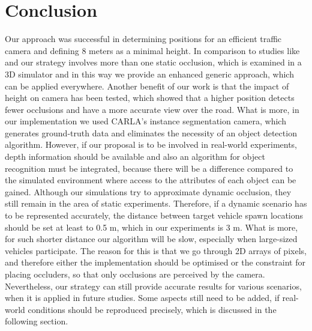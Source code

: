 \section{Conclusion}
Our approach was successful in determining positions for an efficient traffic camera and defining 8 meters as a minimal height. In comparison to studies like \cite{total_coverage_optimum} and \cite{max_camera_coverage} our strategy involves more than one static occlusion, which is examined in a 3D simulator and in this way we provide an enhanced generic approach, which can be applied everywhere. Another benefit of our work is that the impact of height on camera has been tested, which showed that a higher position detects fewer occlusions and have a more accurate view over the road. What is more, in our implementation we used CARLA's instance segmentation camera, which generates ground-truth data and eliminates the necessity of an object detection algorithm. However, if our proposal is to be involved in real-world experiments, depth information should be available and also an algorithm for object recognition must be integrated, because there will be a difference compared to the simulated environment where access to the attributes of each object can be gained. Although our simulations try to approximate dynamic occlusion, they still remain in the area of static experiments. Therefore, if a dynamic scenario has to be represented accurately, the distance between target vehicle spawn locations should be set at least to 0.5 m, which in our experiments is 3 m. What is more, for such shorter distance our algorithm will be slow, especially when large-sized vehicles participate. The reason for this is that we go through 2D arrays of pixels, and therefore either the implementation should be optimised or the constraint for placing occluders, so that only occlusions are perceived by the camera. Nevertheless, our strategy can still provide accurate results for various scenarios, when it is applied in future studies. Some aspects still need to be added, if real-world conditions should be reproduced precisely, which is discussed in the following section.

